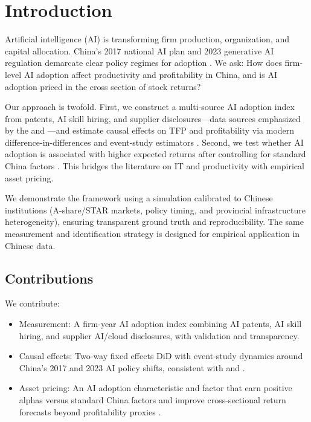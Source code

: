 \section{Introduction}
Artificial intelligence (AI) is transforming firm production, organization, and capital allocation. China’s 2017 national AI plan and 2023 generative AI regulation demarcate clear policy regimes for adoption \citep{StateCouncil2017, CAC2023}. We ask: How does firm-level AI adoption affect productivity and profitability in China, and is AI adoption priced in the cross section of stock returns?

Our approach is twofold. First, we construct a multi-source AI adoption index from patents, AI skill hiring, and supplier disclosures---data sources emphasized by the \citet{WIPO2019} and \citet{AIIndex2024}---and estimate causal effects on TFP and profitability via modern difference-in-differences and event-study estimators \citep{SunAbraham2021, CallawaySantanna2021}. Second, we test whether AI adoption is associated with higher expected returns after controlling for standard China factors \citep{FamaFrench2015, HouXueZhang2015, LiuStambaughYuan2019}. This bridges the literature on IT and productivity \citep{BrynjolfssonHitt2000, Bloom2012} with empirical asset pricing.

We demonstrate the framework using a simulation calibrated to Chinese institutions (A-share/STAR markets, policy timing, and provincial infrastructure heterogeneity), ensuring transparent ground truth and reproducibility. The same measurement and identification strategy is designed for empirical application in Chinese data.

\subsection*{Contributions}
We contribute:
\begin{itemize}
    \item Measurement: A firm-year AI adoption index combining AI patents, AI skill hiring, and supplier AI/cloud disclosures, with validation and transparency.
    \item Causal effects: Two-way fixed effects DiD with event-study dynamics around China’s 2017 and 2023 AI policy shifts, consistent with \citet{SunAbraham2021} and \citet{CallawaySantanna2021}.
    \item Asset pricing: An AI adoption characteristic and factor that earn positive alphas versus standard China factors and improve cross-sectional return forecasts beyond profitability proxies \citep{NovyMarx2013, HouXueZhang2015}.
\end{itemize}

